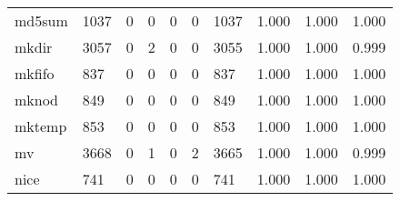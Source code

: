 \begin{longtable}{lp{2.0cm}p{2.0cm}p{2.0cm}p{2.0cm}p{2.0cm}p{2.0cm}p{2.0cm}p{2.0cm}p{2.0cm}}
md5sum    &                   1037 &                                  0 &                                 0 &                                0 &                                 0 &                            1037 &                                1.000 &                                  1.000 &                                1.000 \\
mkdir     &                   3057 &                                  0 &                                 2 &                                0 &                                 0 &                            3055 &                                1.000 &                                  1.000 &                                0.999 \\
mkfifo    &                    837 &                                  0 &                                 0 &                                0 &                                 0 &                             837 &                                1.000 &                                  1.000 &                                1.000 \\
mknod     &                    849 &                                  0 &                                 0 &                                0 &                                 0 &                             849 &                                1.000 &                                  1.000 &                                1.000 \\
mktemp    &                    853 &                                  0 &                                 0 &                                0 &                                 0 &                             853 &                                1.000 &                                  1.000 &                                1.000 \\
mv        &                   3668 &                                  0 &                                 1 &                                0 &                                 2 &                            3665 &                                1.000 &                                  1.000 &                                0.999 \\
nice      &                    741 &                                  0 &                                 0 &                                0 &                                 0 &                             741 &                                1.000 &                                  1.000 &                                1.000 \\

\end{longtable}
